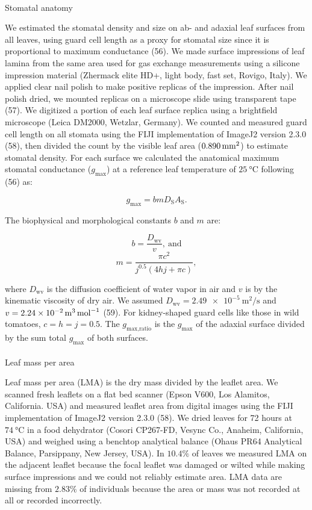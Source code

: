 \documentclass[
  letterpaper,
  DIV=11,
  numbers=noendperiod]{scrartcl}
\makeatletter
\let\oldparagraph\paragraph
\renewcommand{\paragraph}{
    \@ifstar
      \xxxParagraphStar
      \xxxParagraphNoStar
  }
\newcommand{\xxxParagraphStar}[1]{\oldparagraph*{#1}\mbox{}}
\newcommand{\xxxParagraphNoStar}[1]{\oldparagraph{#1}\mbox{}}
\newcommand{\gmax}{$g_\text{max}$}
\newcommand{\gmaxratio}{$g_\text{max,ratio}$}
\makeatother
\begin{document}
\paragraph{Stomatal anatomy}\label{stomatal-anatomy}

We estimated the stomatal density and size on ab- and adaxial leaf
surfaces from all leaves, using guard cell length as a proxy for
stomatal size since it is proportional to maximum conductance (56). We
made surface impressions of leaf lamina from the same area used for gas
exchange measurements using a silicone impression material (Zhermack
elite HD+, light body, fast set, Rovigo, Italy). We applied clear nail
polish to make positive replicas of the impression. After nail polish
dried, we mounted replicas on a microscope slide using transparent tape
(57). We digitized a portion of each leaf surface replica using a
brightfield microscope (Leica DM2000, Wetzlar, Germany). We counted and
measured guard cell length on all stomata using the FIJI implementation
of ImageJ2 version 2.3.0 (58), then divided the count by the visible
leaf area (\(\qty{0.890}{\raiseto{2}\milli\meter}\)) to estimate
stomatal density. For each surface we calculated the anatomical maximum
stomatal conductance (\gmax) at a reference leaf temperature of
\(\qty{25}{\degreeCelsius}\) following (56) as:

\[g_\mathrm{max} = b m D_\mathrm{S} A_\mathrm{S}.\]

The biophysical and morphological constants \(b\) and \(m\) are:

\[b = \frac{D_\mathrm{wv}}{v},~\text{and}\]
\[m = \frac{\pi c ^ 2}{j^{0.5} (4 h j + \pi c)},\]

where \(D_\mathrm{wv}\) is the diffusion coefficient of water vapor in
air and \(v\) is by the kinematic viscosity of dry air. We assumed
\(D_\mathrm{wv} = \qty{2.49e-5}{\meter\squared\per\second}\) and
\(v = \qty{2.24e-2}{\raiseto{3}\meter\per\mol}\) (59). For kidney-shaped
guard cells like those in wild tomatoes, \(c = h = j = 0.5\). The
\gmaxratio{} is the \gmax{} of the adaxial surface divided by the sum
total \gmax{} of both surfaces.

\paragraph{Leaf mass per area}\label{leaf-mass-per-area}

Leaf mass per area (LMA) is the dry mass divided by the leaflet area. We
scanned fresh leaflets on a flat bed scanner (Epson V600, Los Alamitos,
California. USA) and measured leaflet area from digital images using the
FIJI implementation of ImageJ2 version 2.3.0 (58). We dried leaves for
72 hours at \(\qty{74}{\degreeCelsius}\) in a food dehydrator (Cosori
CP267-FD, Vesync Co., Anaheim, California, USA) and weighed using a
benchtop analytical balance (Ohaus PR64 Analytical Balance, Parsippany,
New Jersey, USA). In \(10.4\%\) of leaves we measured LMA on the
adjacent leaflet because the focal leaflet was damaged or wilted while
making surface impressions and we could not reliably estimate area. LMA
data are missing from \(2.83\%\) of individuals because the area or mass
was not recorded at all or recorded incorrectly.
\end{document}

